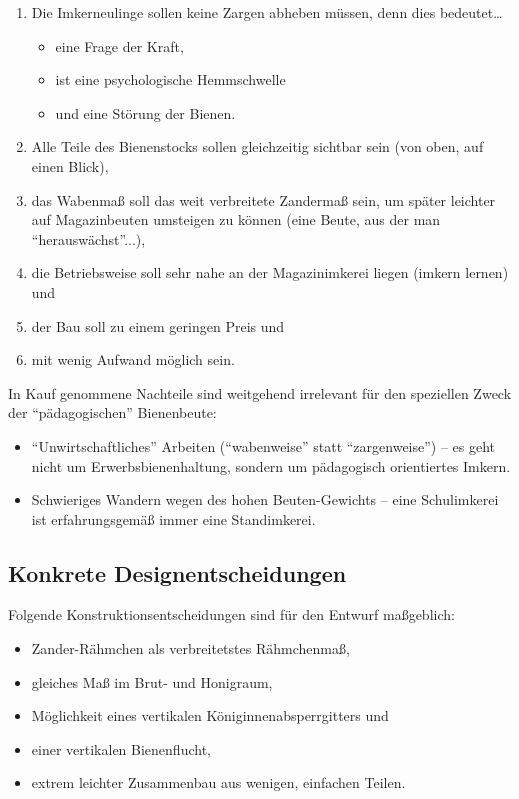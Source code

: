 \documentclass[12pt,a4paper,ngerman]{scrartcl}
\begin{document}
\begin{enumerate}
\item Die Imkerneulinge sollen keine Zargen abheben müssen, denn dies bedeutet\ldots
  \begin{itemize}
  \item eine Frage der Kraft,
  \item ist eine psychologische Hemmschwelle
  \item  und eine Störung der Bienen.
  \end{itemize}
\item Alle Teile des Bienenstocks sollen gleichzeitig sichtbar sein (von oben, auf einen Blick),
\item das Wabenmaß soll das weit verbreitete Zandermaß sein,
  um später leichter auf Magazinbeuten umsteigen zu können (eine Beute, aus der man \enquote{herauswächst}...),
\item die Betriebsweise soll sehr nahe an der Magazinimkerei liegen (imkern lernen) und
\item der Bau soll zu einem geringen Preis und
\item mit wenig Aufwand möglich sein.
\end{enumerate}

In Kauf genommene Nachteile sind weitgehend irrelevant für den speziellen Zweck der \enquote{pädagogischen} Bienenbeute:

\begin{itemize}
\item \enquote{Unwirtschaftliches} Arbeiten (\enquote{wabenweise} statt \enquote{zargenweise}) -- es geht nicht um Erwerbsbienenhaltung,
  sondern um pädagogisch orientiertes Imkern.
\item Schwieriges Wandern wegen des hohen Beuten-Gewichts -- eine Schulimkerei ist erfahrungsgemäß immer eine Standimkerei.
\end{itemize}


\subsection{Konkrete Designentscheidungen}

Folgende Konstruktionsentscheidungen sind für den Entwurf maßgeblich:

\begin{itemize}
\item Zander-Rähmchen als verbreitetstes Rähmchenmaß,
\item gleiches Maß im Brut- und Honigraum,
\item Möglichkeit eines vertikalen Königinnenabsperrgitters und
\item einer vertikalen Bienenflucht,
\item extrem leichter Zusammenbau aus wenigen, einfachen Teilen.
\end{itemize}
\end{document}
